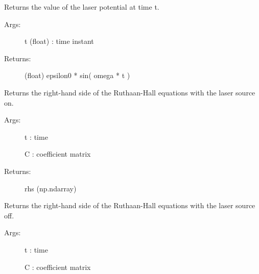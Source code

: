 \documentclass[letterpaper,10pt,english]{sphinxmanual}
\begin{document}
\begin{fulllineitems}
\begin{fulllineitems}
\end{fulllineitems}


\begin{fulllineitems}
\label{\detokenize{index:do.GHF.laser_potential}}
Returns the value of the laser potential at time t.
\begin{description}
\item[{Args:}] \leavevmode
t (float) : time instant

\item[{Returns:}] \leavevmode
(float) epsilon0 * sin( omega * t )

\end{description}

\end{fulllineitems}


\begin{fulllineitems}
\label{\detokenize{index:do.GHF.rhsf}}
Returns the right-hand side of the Ruthaan-Hall equations with the laser source on.
\begin{description}
\item[{Args:}] \leavevmode
t : time

C : coefficient matrix

\item[{Returns:}] \leavevmode
rhs (np.ndarray)

\end{description}

\end{fulllineitems}


\begin{fulllineitems}
\label{\detokenize{index:do.GHF.rhsf_OFF}}
Returns the right-hand side of the Ruthaan-Hall equations with the laser source off.
\begin{description}
\item[{Args:}] \leavevmode
t : time

C : coefficient matrix


\end{description}
\end{fulllineitems}
\end{fulllineitems}
\end{document}
